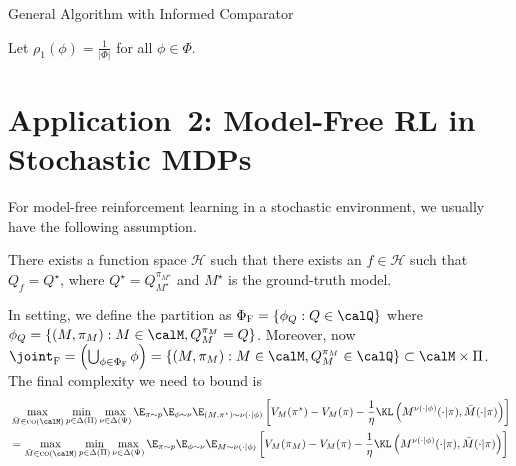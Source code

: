 \begin{algorithm}
\caption{General Algorithm with Informed Comparator} \label{alg:general AIR full info}
    Let $\rho_1(\phi) = \frac{1}{|\Phi|}$ for all $\phi \in \Phi$. \\
\end{algorithm}



\section{Application~2: Model-Free RL in Stochastic MDPs}


For model-free reinforcement learning in a stochastic environment, we usually have the following assumption.

\begin{assumption}
    There exists a function space $\mathcal{H}$ such that there exists an $f \in \mathcal{H}$ such that $Q_f = Q^{\star}$, where $Q^\star = Q^{ \pi_{M^\star}}_{M^\star}$ and $M^\star$ is the ground-truth model.
\end{assumption}


In setting, we define the partition as $\Phi_{\textsc{F}} = \left\{\phi_{Q}: Q \in \calQ \right\}$ where $\phi_{Q} = \left\{(M, \pi_M): M \in \calM, Q_M^{\pi_M} = Q\right\}$. Moreover, now $\joint_{\textsc{F}} = \left(\bigcup_{\phi\in\Phi_\textsc{F}} \phi\right) = \left\{(M, \pi_M): M \in \calM, Q_M^{\pi_M} \in \calQ \right\}\subset \calM\times \Pi$. The final complexity we need to bound is 
\begin{align*}
&\max_{\Bar{M} \in \textsc{co}(\calM)}    
 \min_{p\in\Delta(\Pi)} \max_{\nu\in \Delta(\Psi)} \E_{\pi\sim p} \E_{\phi\sim \nu}  \E_{(M,\pi^\star)\sim \nu(\cdot|\phi)} \left[V_{M}(\pi^\star) - V_{M}(\pi) - \frac{1}{\eta}  \KL\left( M^{\nu(\cdot|\phi)}(\cdot|\pi), \Bar{M}(\cdot|\pi) \right)\right]   
 \\&=  \max_{\Bar{M} \in \textsc{co}(\calM)}    
 \min_{p\in\Delta(\Pi)} \max_{\nu\in \Delta(\Psi)} \E_{\pi\sim p} \E_{\phi\sim \nu}  \E_{M\sim \nu(\cdot|\phi)} \left[V_{M}(\pi_M) - V_{M}(\pi) - \frac{1}{\eta}  \KL\left( M^{\nu(\cdot|\phi)}(\cdot|\pi), \Bar{M}(\cdot|\pi) \right)\right]   
\end{align*}

